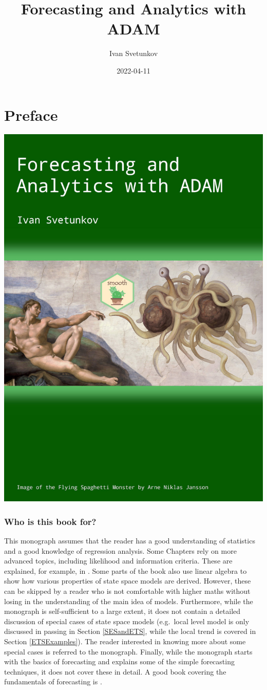 \documentclass[
]{book}
\title{Forecasting and Analytics with ADAM}
\author{Ivan Svetunkov}
\date{2022-04-11}
\theoremstyle{definition}
\theoremstyle{definition}
\theoremstyle{definition}
\theoremstyle{definition}
\theoremstyle{remark}
\begin{document}
\maketitle

{
\setcounter{tocdepth}{1}
\tableofcontents
}
\hypertarget{preface}{%
\chapter*{Preface}\label{preface}}

\begin{center}\includegraphics[width=0.6\linewidth]{images/Adam-Title-web} \end{center}

\hypertarget{who-is-this-book-for}{%
\subsection*{Who is this book for?}\label{who-is-this-book-for}}

This monograph assumes that the reader has a good understanding of statistics and a good knowledge of regression analysis. Some Chapters rely on more advanced topics, including likelihood and information criteria. These are explained, for example, in \citet{SvetunkovSBA}. Some parts of the book also use linear algebra to show how various properties of state space models are derived. However, these can be skipped by a reader who is not comfortable with higher maths without losing in the understanding of the main idea of models. Furthermore, while the monograph is self-sufficient to a large extent, it does not contain a detailed discussion of special cases of state space models (e.g.~local level model is only discussed in passing in Section \ref{SESandETS}, while the local trend is covered in Section \ref{ETSExamples}). The reader interested in knowing more about some special cases is referred to the \citet{Hyndman2008b} monograph. Finally, while the monograph starts with the basics of forecasting and explains some of the simple forecasting techniques, it does not cover these in detail. A good book covering the fundamentals of forecasting is \citet{Ord2017}.
\end{document}
